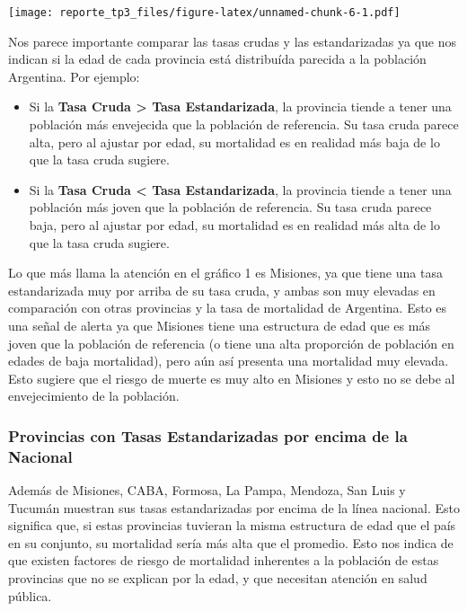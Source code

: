 \documentclass[
]{article}
\begin{document}
\texttt{[image: reporte\_tp3\_files/figure-latex/unnamed-chunk-6-1.pdf]}

Nos parece importante comparar las tasas crudas y las estandarizadas ya
que nos indican si la edad de cada provincia está distribuída parecida a
la población Argentina. Por ejemplo:

\begin{itemize}
\item
  Si la \textbf{Tasa Cruda \textgreater{} Tasa Estandarizada}, la
  provincia tiende a tener una población más envejecida que la población
  de referencia. Su tasa cruda parece alta, pero al ajustar por edad, su
  mortalidad es en realidad más baja de lo que la tasa cruda sugiere.
\item
  Si la \textbf{Tasa Cruda \textless{} Tasa Estandarizada}, la provincia
  tiende a tener una población más joven que la población de referencia.
  Su tasa cruda parece baja, pero al ajustar por edad, su mortalidad es
  en realidad más alta de lo que la tasa cruda sugiere.
\end{itemize}

Lo que más llama la atención en el gráfico 1 es Misiones, ya que tiene
una tasa estandarizada muy por arriba de su tasa cruda, y ambas son muy
elevadas en comparación con otras provincias y la tasa de mortalidad de
Argentina. Esto es una señal de alerta ya que Misiones tiene una
estructura de edad que es más joven que la población de referencia (o
tiene una alta proporción de población en edades de baja mortalidad),
pero aún así presenta una mortalidad muy elevada. Esto sugiere que el
riesgo de muerte es muy alto en Misiones y esto no se debe al
envejecimiento de la población.

\subsubsection{Provincias con Tasas Estandarizadas por encima de la
Nacional}\label{provincias-con-tasas-estandarizadas-por-encima-de-la-nacional}

Además de Misiones, CABA, Formosa, La Pampa, Mendoza, San Luis y Tucumán
muestran sus tasas estandarizadas por encima de la línea nacional. Esto
significa que, si estas provincias tuvieran la misma estructura de edad
que el país en su conjunto, su mortalidad sería más alta que el
promedio. Esto nos indica de que existen factores de riesgo de
mortalidad inherentes a la población de estas provincias que no se
explican por la edad, y que necesitan atención en salud pública.
\end{document}
